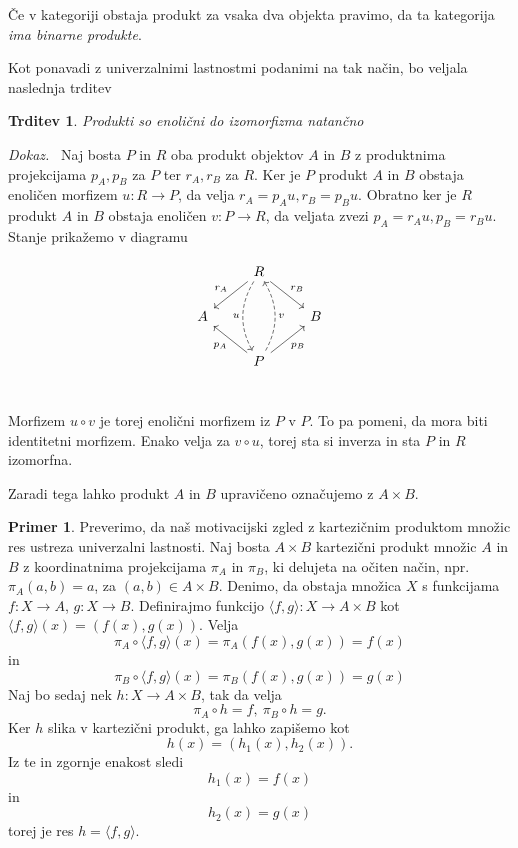 \documentclass[12pt,a4paper]{book}
\theoremstyle{definition}
\theoremstyle{plain}
\newtheorem{trditev}[definicija]{Trditev}
\newenvironment{dokaz}{\emph{Dokaz.}\ }{\hspace{\fill}{$\Box$}}
\theoremstyle{definition}
\newtheorem{primer}{Primer}[section]
\theoremstyle{remark}
\begin{document}
Če v kategoriji obstaja produkt za vsaka dva objekta pravimo, da ta kategorija \textit{ima binarne produkte}.


Kot ponavadi z univerzalnimi lastnostmi podanimi na tak način, bo veljala naslednja trditev

\begin{trditev}
Produkti so enolični do izomorfizma natančno
\end{trditev}
\begin{dokaz}
Naj bosta $P$ in $R$ oba produkt objektov $A$ in $B$ z produktnima projekcijama $p_A, p_B$ za $P$ ter $r_A, r_B$ za $R$. Ker je $P$ produkt $A$ in $B$ obstaja enoličen morfizem $u : R \to P$, da velja $r_A = p_Au, r_B = p_Bu$. Obratno ker je $R$ produkt $A$ in $B$ obstaja enoličen $v : P \to R$, da veljata zvezi $p_A = r_Au, p_B = r_Bu$. Stanje prikažemo v diagramu

$$\begin{tikzcd}
& R \ar[dd, dashed, bend right, "u"'] \ar[dl, "r_A"'] \ar[dr, "r_B"] & \\
A & & B \\
& P \ar[uu, dashed, bend right, "v"'] \ar[ul, "p_A"] \ar[ur, "p_B"'] & \\
\end{tikzcd}$$

Morfizem $u \circ v $ je torej enolični morfizem iz $P$ v $P$. To pa pomeni, da mora biti identitetni morfizem. Enako velja za $v \circ u$, torej sta si inverza in sta $P$ in $R$ izomorfna.
\end{dokaz}

Zaradi tega lahko produkt $A$ in $B$ upravičeno označujemo z $A \times B$.

\begin{primer}
Preverimo, da naš motivacijski zgled z kartezičnim produktom množic res ustreza univerzalni lastnosti. Naj bosta $A \times B$ kartezični produkt množic $A$ in $B$ z koordinatnima projekcijama $\pi_A$ in $\pi_B$, ki delujeta na očiten način, npr. $\pi_A(a,b) = a$, za $(a,b) \in A \times B$. Denimo, da obstaja množica $X$ s funkcijama $f : X \to A$, $g : X \to B$. Definirajmo funkcijo $\langle f,g \rangle : X \to A \times B$ kot $\langle f,g \rangle(x) = (f(x),g(x))$. Velja 
$$ \pi_A \circ \langle f,g \rangle (x) = \pi_A(f(x),g(x)) = f(x) $$
in 
$$ \pi_B \circ \langle f,g \rangle (x) = \pi_B(f(x),g(x)) = g(x) $$
Naj bo sedaj nek $h : X \to A \times B$, tak da velja
$$\pi_A \circ h = f, \ \pi_B \circ h = g.$$
Ker $h$ slika v kartezični produkt, ga lahko zapišemo kot 
$$h(x) = (h_1(x),h_2(x)).$$
Iz te in zgornje enakost sledi
$$h_1(x) = f(x)$$
in $$h_2(x) = g(x)$$
torej je res $h = \langle f,g \rangle$.
\end{primer}
\end{document}
